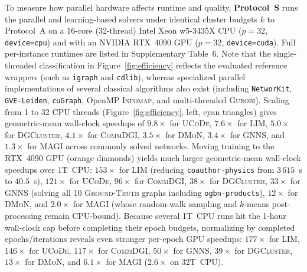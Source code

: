 \documentclass[11pt,a4paper]{article}
\begin{document}
To measure how parallel hardware affects runtime and quality, \textbf{Protocol~S} runs the parallel and learning-based solvers under identical cluster budgets $k$ to Protocol~A on a 16-core (32-thread) Intel Xeon w5-3435X CPU ($p = 32$, \texttt{device=cpu}) and with an NVIDIA RTX~4090 GPU ($p = 32$, \texttt{device=cuda}). Full per-instance runtimes are listed in Supplementary Table~6. Note that the single-threaded classification in Figure~\ref{fig:efficiency} reflects the evaluated reference wrappers (such as \texttt{igraph} and \texttt{cdlib}), whereas specialized parallel implementations of several classical algorithms also exist (including \texttt{NetworKit}, \texttt{GVE-Leiden}, \texttt{cuGraph}, OpenMP \textsc{Infomap}, and multi-threaded \textsc{Gurobi}). Scaling from 1 to 32 CPU threads (Figure~\ref{fig:efficiency}, left, cyan triangles) gives geometric-mean wall-clock speedups of $9.8\times$ for \textsc{UCoDe}, $7.6\times$ for \textsc{LIM}, $5.0\times$ for \textsc{DGCluster}, $4.1\times$ for \textsc{CommDGI}, $3.5\times$ for \textsc{DMoN}, $3.4\times$ for \textsc{GNNS}, and $1.3\times$ for \textsc{MAGI} across commonly solved networks. Moving training to the RTX~4090 GPU (orange diamonds) yields much larger geometric-mean wall-clock speedups over 1T~CPU: $153\times$ for \textsc{LIM} (reducing \texttt{coauthor-physics} from $3\,615$~s to $40.5$~s), $121\times$ for \textsc{UCoDe}, $96\times$ for \textsc{CommDGI}, $38\times$ for \textsc{DGCluster}, $33\times$ for \textsc{GNNS} (solving all 10 \textsc{Ground-Truth} graphs including \texttt{ogbn-products}), $12\times$ for \textsc{DMoN}, and $2.0\times$ for \textsc{MAGI} (whose random-walk sampling and $k$-means post-processing remain CPU-bound). Because several 1T~CPU runs hit the 1-hour wall-clock cap before completing their epoch budgets, normalizing by completed epochs/iterations reveals even stronger per-epoch GPU speedups: $177\times$ for \textsc{LIM}, $146\times$ for \textsc{UCoDe}, $117\times$ for \textsc{CommDGI}, $50\times$ for \textsc{GNNS}, $39\times$ for \textsc{DGCluster}, $13\times$ for \textsc{DMoN}, and $6.1\times$ for \textsc{MAGI} ($2.6\times$ on 32T~CPU).
\end{document}
